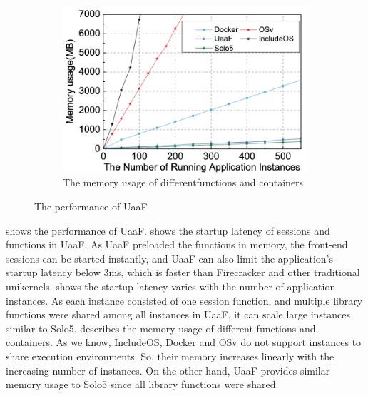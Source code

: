 \begin{figure}[!b]
\begin{subfigure}{0.33\textwidth}
  \includegraphics[width=\linewidth]{images/uaaf_multiple_memory.png}
  \caption{The memory usage of differentfunctions and containers}
  \label{fig:uaaf_memoryvsmultiple}
\end{subfigure} \hfil%
\caption{The performance of UaaF \cite{tan2020unikernel}}
\label{fig:uaaf_performance}
\end{figure}
 shows the performance of UaaF.  shows the startup latency of sessions and functions in UaaF. As UaaF preloaded the functions in memory, the front-end sessions can be started instantly, and UaaF can also limit the application's startup latency below 3ms, which is faster than Firecracker and other traditional unikernels.  shows the startup latency varies with the number of application instances. As each instance consisted of one session function, and multiple library functions were shared among all instances in UaaF, it can scale large instances similar to Solo5.  describes the memory usage of different-functions and containers. As we know, IncludeOS, Docker and OSv do not support instances to share execution environments. So, their memory increases linearly with the increasing number of instances. On the other hand, UaaF provides similar memory usage to Solo5 since all library functions were shared.







